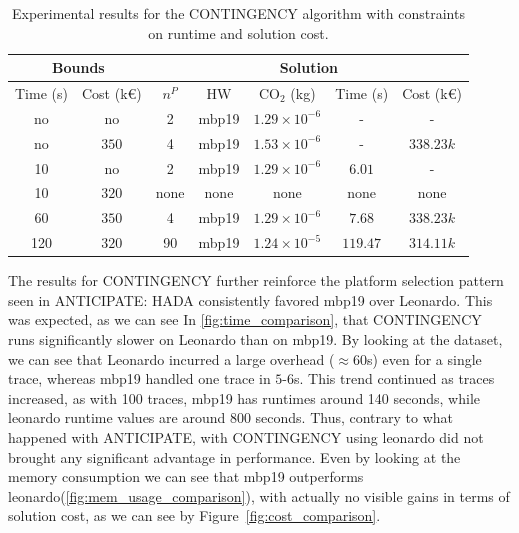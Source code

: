 \documentclass[a4paper,singleside,12pt]{report} %
\begin{document}
\begin{table}[h!]
    \centering
    \begin{tabular}{|cc|ccccc|}
        \hline
        \multicolumn{2}{|c|}{Bounds} & \multicolumn{5}{c|}{Solution} \\
        \hline
        Time (s) & Cost (k€) & $n^P$ & HW & CO$_2$ (kg) & Time (s) & Cost (k€) \\
        \hline
        no & no & 2 & mbp19 & $1.29 \times 10^{-6}$ & - & - \\
        no & $350$ & 4 & mbp19 & $1.53 \times 10^{-6}$ & - & $338.23k$ \\
        10 & no & 2 & mbp19 & $1.29 \times 10^{-6}$ & $6.01$ & - \\
        10 & $320$ & none & none & none & none & none \\
        60 & $350$ & 4 & mbp19 & $1.29 \times 10^{-6}$ & $7.68$ & $338.23k$ \\
        120 & $320$ & 90 & mbp19 & $1.24 \times 10^{-5}$ & $119.47$ & $314.11k$ \\
        \hline
    \end{tabular}
    \caption{Experimental results for the CONTINGENCY algorithm with constraints on runtime and solution cost.}
    \label{tab:contingency_results}
\end{table}

The results for CONTINGENCY further reinforce the platform selection pattern seen in ANTICIPATE: HADA consistently favored mbp19 over Leonardo. This was expected, as we can see In
\ref{fig:time_comparison}, that CONTINGENCY runs significantly slower on Leonardo than on mbp19. By looking at the dataset, we can see that Leonardo incurred a large overhead ($\approx60$s) 
even for a single trace, whereas mbp19 handled one trace in $5$-$6$s. This trend continued as traces increased, as with 100 traces, mbp19 has runtimes around 140 seconds, while leonardo runtime
values are around 800 seconds. Thus, contrary to what happened with ANTICIPATE, with CONTINGENCY using leonardo did not brought any significant advantage in performance. Even by looking at the
memory consumption we can see that mbp19 outperforms leonardo(\ref{fig:mem_usage_comparison}), with actually no visible gains in terms of solution cost, as we can see by Figure~\ref{fig:cost_comparison}. 
\end{document}
